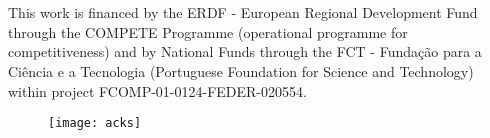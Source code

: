 \chapter*{}

This work is financed by the ERDF - European Regional Development Fund through the COMPETE Programme (operational programme for competitiveness) and by National Funds through the FCT - Fundação para a Ciência e a Tecnologia (Portuguese Foundation for Science and Technology) within project FCOMP-01-0124-FEDER-020554.

\begin{figure}[!b]
  \begin{center}
    \leavevmode
    \texttt{[image: acks]}
    \label{fig:arch}
  \end{center}
\end{figure}